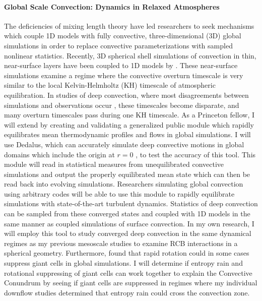 \documentclass[onecolumn, hmargin=1in, vmargin=1in]{aastex62}
\begin{document}
\paragraph{Global Scale Convection: Dynamics in Relaxed Atmospheres}
The deficiencies of mixing length theory have led researchers to seek mechanisms which couple 1D models with fully convective, three-dimensional (3D) global simulations in order to replace convective parameterizations with sampled nonlinear statistics.
Recently, 3D spherical shell simulations of convection in thin, near-surface layers have been coupled to 1D models by \citet{jorgensen&weiss2019}.
These near-surface simulations examine a regime where the convective overturn timescale is very similar to the local Kelvin-Helmholtz (KH) timescale of atmospheric equilibration.
In studies of deep convection, where most disagreements between simulations and observations occur \citep[the Convective Conundrum,][]{hanasoge&all2015}, these timescales become disparate, and many overturn timescales pass during one KH timescale.
As a Princeton fellow, I will extend \citet{anders&all2018} by creating and validating a generalized public module which rapidly equilibrates mean thermodynamic profiles and flows in global simulations.
I will use Dedalus, which can accurately simulate deep convective motions in global domains which include the origin at $r = 0$ \citep{lecoanet&all2019}, to test the accuracy of this tool.
This module will read in statistical measures from unequilibrated convective simulations and output the properly equilibrated mean state which can then be read back into evolving simulations.
Researchers simulating global convection using arbitrary codes will be able to use this module to rapidly equilibrate simulations with state-of-the-art turbulent dynamics.
Statistics of deep convection can be sampled from these converged states and coupled with 1D models in the same manner as \citet{jorgensen&weiss2019} coupled simulations of surface convection.
In my own research, I will employ this tool to study converged deep convection in the same dynamical regimes as my previous mesoscale studies to examine RCB interactions in a spherical geometry.
Furthermore, \citet{featherstone&hindman2016} found that rapid rotation could in some cases suppress giant cells in global simulations.
I will determine if entropy rain and rotational suppressing of giant cells can work together to explain the Convective Conundrum by seeing if giant cells are suppressed in regimes where my individual downflow studies determined that entropy rain could cross the convection zone.
\end{document}

